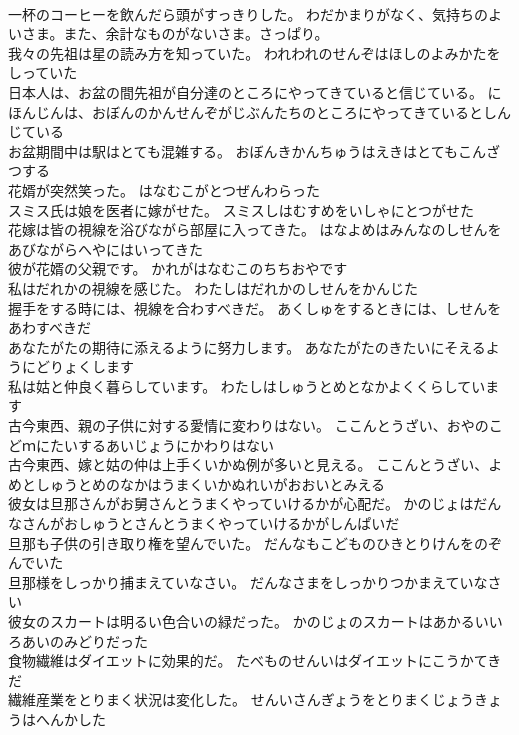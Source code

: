 \documentclass[8pt]{extreport}
\begin{document}
\begin{CJK}{UTF8}{min}
\\	一杯のコーヒーを飲んだら頭がすっきりした。	わだかまりがなく、気持ちのよいさま。また、余計なものがないさま。さっぱり。
\\	我々の先祖は星の読み方を知っていた。	われわれのせんぞはほしのよみかたをしっていた 
\\	日本人は、お盆の間先祖が自分達のところにやってきていると信じている。	にほんじんは、おぼんのかんせんぞがじぶんたちのところにやってきているとしんじている 
\\	お盆期間中は駅はとても混雑する。	おぼんきかんちゅうはえきはとてもこんざつする 
\\	花婿が突然笑った。	はなむこがとつぜんわらった 
\\	スミス氏は娘を医者に嫁がせた。	スミスしはむすめをいしゃにとつがせた 
\\	花嫁は皆の視線を浴びながら部屋に入ってきた。	はなよめはみんなのしせんをあびながらへやにはいってきた 
\\	彼が花婿の父親です。	かれがはなむこのちちおやです 
\\	私はだれかの視線を感じた。	わたしはだれかのしせんをかんじた 
\\	握手をする時には、視線を合わすべきだ。	あくしゅをするときには、しせんをあわすべきだ 
\\	あなたがたの期待に添えるように努力します。	あなたがたのきたいにそえるようにどりょくします 
\\	私は姑と仲良く暮らしています。	わたしはしゅうとめとなかよくくらしています 
\\	古今東西、親の子供に対する愛情に変わりはない。	ここんとうざい、おやのこどｍにたいするあいじょうにかわりはない 
\\	古今東西、嫁と姑の仲は上手くいかぬ例が多いと見える。	ここんとうざい、よめとしゅうとめのなかはうまくいかぬれいがおおいとみえる 
\\	彼女は旦那さんがお舅さんとうまくやっていけるかが心配だ。	かのじょはだんなさんがおしゅうとさんとうまくやっていけるかがしんぱいだ 
\\	旦那も子供の引き取り権を望んでいた。	だんなもこどものひきとりけんをのぞんでいた 
\\	旦那様をしっかり捕まえていなさい。	だんなさまをしっかりつかまえていなさい 
\\	彼女のスカートは明るい色合いの緑だった。	かのじょのスカートはあかるいいろあいのみどりだった 
\\	食物繊維はダイエットに効果的だ。	たべものせんいはダイエットにこうかてきだ 
\\	繊維産業をとりまく状況は変化した。	せんいさんぎょうをとりまくじょうきょうはへんかした 

\end{CJK}
\end{document}
